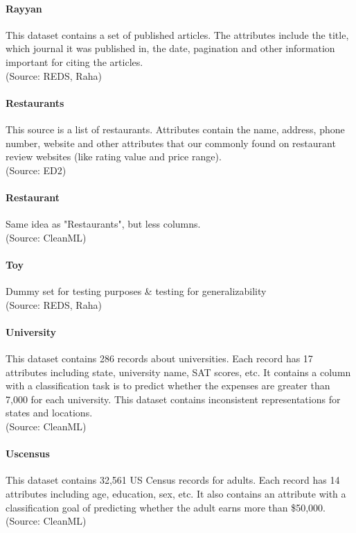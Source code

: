 \paragraph{Rayyan}
This dataset contains a set of published articles. The attributes include the title, which journal it was published in, the date, pagination and other information important for citing the articles.
\\(Source: REDS, Raha)

\paragraph{Restaurants}
This source is a list of restaurants. Attributes contain the name, address, phone number, website and other attributes that our commonly found on restaurant review websites (like rating value and price range).
\\(Source: ED2)

\paragraph{Restaurant}
Same idea as "Restaurants", but less columns.
\\(Source: CleanML)

\paragraph{Toy}
Dummy set for testing purposes \& testing for generalizability
\\(Source: REDS, Raha)

\paragraph{University}
This dataset contains 286 records about universities. Each record has 17 attributes including state, university name, SAT scores, etc. It contains a column with a classification task is to predict whether the expenses are greater than 7,000 for each university. This dataset contains inconsistent representations for states and locations.
\\(Source: CleanML)

\paragraph{Uscensus}
This dataset contains 32,561 US Census records for adults. Each record has 14 attributes including age, education, sex, etc. It also contains an attribute with a classification goal of predicting whether the adult earns more than \$50,000. 
\\(Source: CleanML)


